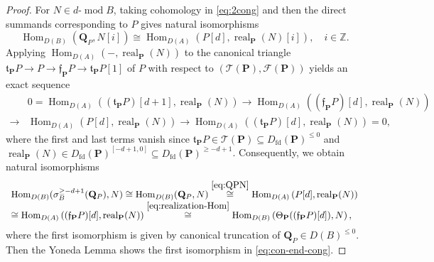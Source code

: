 \documentclass[11pt,a4paper,reqno]{amsart}
\theoremstyle{plain}
\numberwithin{equation}{section}
\theoremstyle{definition}
\renewcommand{\mod}{\operatorname{mod}}
\newcommand{\Hom}{\operatorname{Hom}}
\newcommand{\real}{\operatorname{real}}
\newcommand{\emod}[2]{#1\text{-}\!\mod #2}
\newcommand{\eheart}[2]{#2^{[-#1+1,0]}}
\newcommand{\PP}{\mathbf{P}}
\newcommand{\QQ}{\mathbf{Q}}
\newcommand{\T}{\mathcal{T}}
\newcommand{\F}{\mathcal{F}}
\begin{document}
\begin{proof}
  For $N\in\emod{d}{B}$, taking cohomology in \eqref{eq:2cong} and then the direct summands corresponding
to $P$ gives natural isomorphisms
\begin{equation}\label{eq:QPN}
  \Hom_{D(B)}(\QQ_P,N[i])\cong\Hom_{D(A)}(P[d],\real_{\PP}(N)[i]),\quad i\in\mathbb Z.
\end{equation}
Applying $\Hom_{D(A)}(-,\real_{\PP}(N))$ to the canonical triangle $\mathfrak{t}_{\PP}P\to P\to\mathfrak{f}_{\PP}P\to\mathfrak{t}_{\PP}P[1]$ of $P$ with respect to $(\T(\PP),\F(\PP))$ yields an exact sequence
\[
\begin{array}{rl}
  &0=\Hom_{D(A)}\left((\mathfrak{t}_{\PP}P)[d+1],\real_{\PP}(N)\right)\to \Hom_{D(A)}\left((\mathfrak{f}_{\PP}P)[d],\real_{\PP}(N)\right)\\
  \to & \Hom_{D(A)}\left(P[d],\real_{\PP}(N)\right)\to \Hom_{D(A)}\left((\mathfrak{t}_{\PP}P)[d],\real_{\PP}(N)\right)=0,
\end{array}
\]
where the first and last terms vanish since $\mathfrak{t}_{\PP}P\in\T(\PP)\subseteq D_{\mathrm{fd}}(\PP)^{\leq 0}$ and $\real_{\PP}(N)\in \eheart{d}{D_{\mathrm{fd}}(\PP)}\subseteq D_{\mathrm{fd}}(\PP)^{\geq-d+1}$. Consequently, we obtain natural isomorphisms
\[\begin{array}{l}
  \Hom_{D(B)}(\sigma_B^{\geq-d+1}(\QQ_P),N)\cong\Hom_{D(B)}(\QQ_P,N)\overset{\eqref{eq:QPN}}{\cong}
   \Hom_{D(A)}\left(P[d],\real_{\PP}(N)\right)\\
  \cong \Hom_{D(A)}
   \left((\mathfrak{f}_{\PP}P)[d],\real_{\PP}(N)\right)\overset{\eqref{eq:realization-Hom}}{\cong}
   \Hom_{D(B)}
   \left(\Theta_{\PP}((\mathfrak{f}_{\PP}P)[d]),N\right),
\end{array}\]
where the first isomorphism is given by canonical truncation of $\QQ_P\in D(B)^{\leq0}$. Then the Yoneda Lemma shows the first isomorphism in \eqref{eq:con-end-cong}.


\end{proof}
\end{document}
